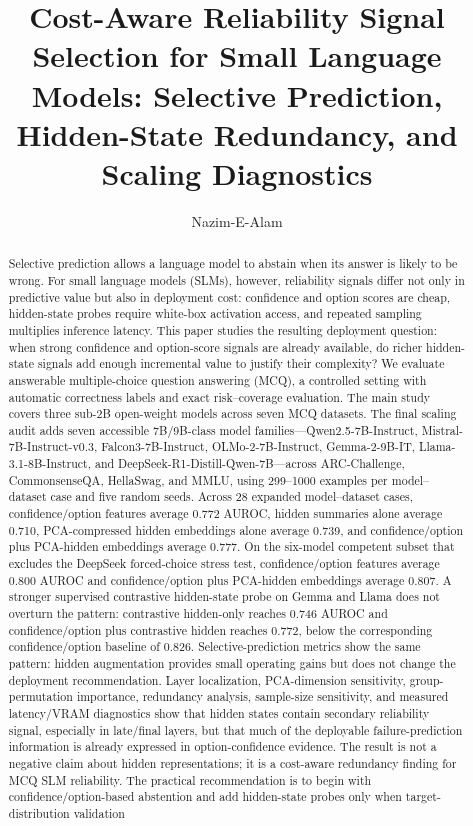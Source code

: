 \documentclass[preprint,12pt,authoryear]{elsarticle}
\begin{document}
\begin{frontmatter}

\title{Cost-Aware Reliability Signal Selection for Small Language Models: Selective Prediction, Hidden-State Redundancy, and Scaling Diagnostics}

\author[aff1]{Nazim-E-Alam}

\begin{abstract}
Selective prediction allows a language model to abstain when its answer is likely to be wrong. For small language models (SLMs), however, reliability signals differ not only in predictive value but also in deployment cost: confidence and option scores are cheap, hidden-state probes require white-box activation access, and repeated sampling multiplies inference latency. This paper studies the resulting deployment question: when strong confidence and option-score signals are already available, do richer hidden-state signals add enough incremental value to justify their complexity? We evaluate answerable multiple-choice question answering (MCQ), a controlled setting with automatic correctness labels and exact risk--coverage evaluation. The main study covers three sub-2B open-weight models across seven MCQ datasets. The final scaling audit adds seven accessible 7B/9B-class model families---Qwen2.5-7B-Instruct, Mistral-7B-Instruct-v0.3, Falcon3-7B-Instruct, OLMo-2-7B-Instruct, Gemma-2-9B-IT, Llama-3.1-8B-Instruct, and DeepSeek-R1-Distill-Qwen-7B---across ARC-Challenge, CommonsenseQA, HellaSwag, and MMLU, using 299--1000 examples per model--dataset case and five random seeds. Across 28 expanded model--dataset cases, confidence/option features average 0.772 AUROC, hidden summaries alone average 0.710, PCA-compressed hidden embeddings alone average 0.739, and confidence/option plus PCA-hidden embeddings average 0.777. On the six-model competent subset that excludes the DeepSeek forced-choice stress test, confidence/option features average 0.800 AUROC and confidence/option plus PCA-hidden embeddings average 0.807. A stronger supervised contrastive hidden-state probe on Gemma and Llama does not overturn the pattern: contrastive hidden-only reaches 0.746 AUROC and confidence/option plus contrastive hidden reaches 0.772, below the corresponding confidence/option baseline of 0.826. Selective-prediction metrics show the same pattern: hidden augmentation provides small operating gains but does not change the deployment recommendation. Layer localization, PCA-dimension sensitivity, group-permutation importance, redundancy analysis, sample-size sensitivity, and measured latency/VRAM diagnostics show that hidden states contain secondary reliability signal, especially in late/final layers, but that much of the deployable failure-prediction information is already expressed in option-confidence evidence. The result is not a negative claim about hidden representations; it is a cost-aware redundancy finding for MCQ SLM reliability. The practical recommendation is to begin with confidence/option-based abstention and add hidden-state probes only when target-distribution validation 
\end{abstract}
\end{frontmatter}
\end{document}
